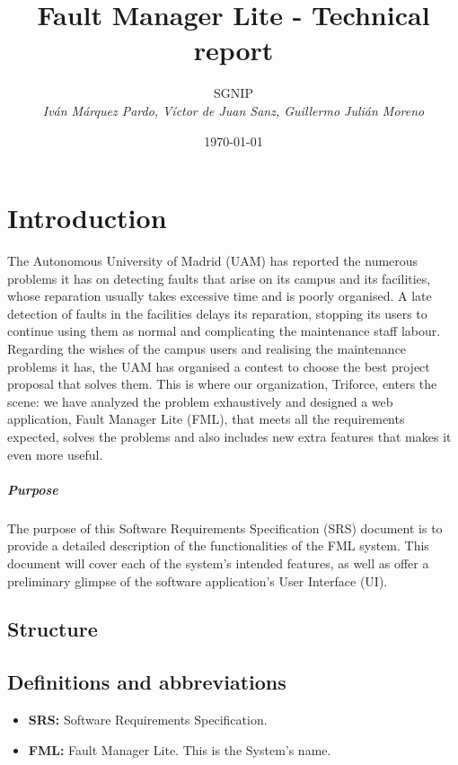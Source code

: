 \documentclass{report}
\title{Fault Manager Lite - Technical report}
\date{\today}
\author{{\Large SGNIP} \\ \vspace{5pt} \textit{Iván Márquez Pardo, Víctor de Juan Sanz, Guillermo Julián Moreno}}
\begin{document}
\maketitle
\tableofcontents
\newpage
\pagestyle{plain}
\begin{abstract}
\end{abstract}

\chapter{Introduction}

The Autonomous University of Madrid (UAM) has reported the numerous problems it has on detecting faults that arise on its campus and its facilities, whose reparation usually takes excessive time and is poorly organised. A late detection of faults in the facilities delays its reparation, stopping its users to continue using them as normal and complicating the maintenance staff labour. Regarding the wishes of the campus users and realising the maintenance problems it has, the UAM has organised a contest to choose the best project proposal that solves them.
This is where our organization, Triforce, enters the scene: we have analyzed the problem exhaustively and designed a web application, Fault Manager Lite (FML), that meets all the requirements expected, solves the problems and also includes new extra features that makes it even more useful.

\paragraph{Purpose} The purpose of this Software Requirements Specification (SRS) document is to provide a detailed description of the functionalities of the FML system. This document will cover each of the system's intended features, as well as offer a preliminary glimpse of the software application's User Interface (UI).

\section{Structure}

\section{Definitions and abbreviations}

\begin{itemize}
\item \textbf{SRS: } Software Requirements Specification.

\item \textbf{FML: } Fault Manager Lite. This is the System's name.

\end{itemize}
\end{document}
